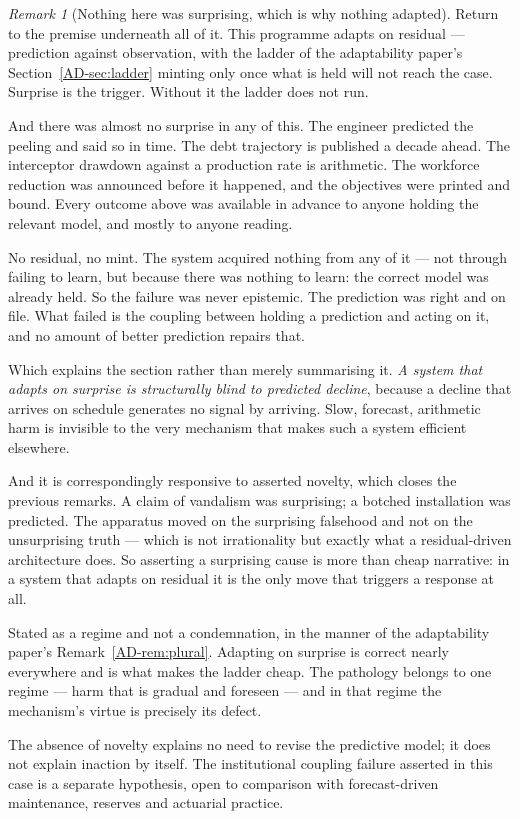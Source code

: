 \documentclass[11pt,a4paper]{article}
\theoremstyle{remark}
\newtheorem{remark}[definition]{Remark}
\begin{document}
\begin{remark}[Nothing here was surprising, which is why nothing adapted]\label{rem:surprise}
Return to the premise underneath all of it. This programme adapts on residual --- prediction
against observation, with the ladder of the adaptability paper's Section~\ref{AD-sec:ladder} minting only once what is held will not reach the
case. Surprise is the trigger. Without it the ladder does not run.

And there was almost no surprise in any of this. The engineer predicted the peeling and said so
in time. The debt trajectory is published a decade ahead. The interceptor drawdown against a production
rate is arithmetic. The workforce reduction was announced before it happened, and the objectives were
printed and bound. Every outcome above was available in advance to anyone holding the relevant
model, and mostly to anyone reading.

No residual, no mint. The system acquired nothing from any of it --- not through failing to learn,
but because there was nothing to learn: the correct model was already held. So the failure was
never epistemic. The prediction was right and on file. What failed is the coupling between holding a
prediction and acting on it, and no amount of better prediction repairs that.

Which explains the section rather than merely summarising it. \emph{A system that adapts on
surprise is structurally blind to predicted decline}, because a decline that arrives on schedule
generates no signal by arriving. Slow, forecast, arithmetic harm is invisible to the very mechanism that
makes such a system efficient elsewhere.

And it is correspondingly responsive to asserted novelty, which closes the previous remarks. A
claim of vandalism was surprising; a botched installation was predicted. The apparatus moved on the
surprising falsehood and not on the unsurprising truth --- which is not irrationality but exactly
what a residual-driven architecture does. So asserting a surprising cause is more than cheap narrative:
in a system that adapts on residual it is the only move that triggers a response at all.

Stated as a regime and not a condemnation, in the manner of the adaptability paper's Remark~\ref{AD-rem:plural}. Adapting on
surprise is correct nearly everywhere and is what makes the ladder cheap. The pathology belongs to
one regime --- harm that is gradual and foreseen --- and in that regime the mechanism's virtue is
precisely its defect.
\end{remark}
The absence of novelty explains no need to revise the predictive model;
it does not explain inaction by itself. The institutional coupling failure
asserted in this case is a separate hypothesis, open to comparison with
forecast-driven maintenance, reserves and actuarial practice.
\end{document}
